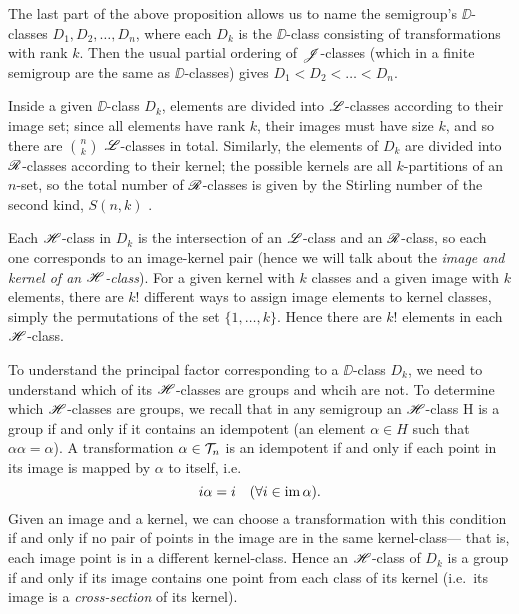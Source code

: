 The last part of the above proposition allows us to name the semigroup's
$\DD$-classes $D_1, D_2, \dots, D_n$, where each $D_k$ is the $\DD$-class
consisting of transformations with rank $k$.  Then the usual partial ordering of
$\mathrel{\mathscr{J}}$-classes (which in a finite semigroup are the same as $\DD$-classes) gives
$D_1 < D_2 < \dots < D_n$.

Inside a given $\DD$-class $D_k$, elements are divided into $\mathrel{\mathscr{L}}$-classes
according to their image set; since all elements have rank $k$, their images
must have size $k$, and so there are $\binom{n}{k}$ $\mathrel{\mathscr{L}}$-classes in total.
Similarly, the elements of $D_k$ are divided into $\mathrel{\mathscr{R}}$-classes according to
their kernel; the possible kernels are all $k$-partitions of an $n$-set, so the
total number of $\mathrel{\mathscr{R}}$-classes is given by the Stirling number of the second
kind, $S(n,k)$ .

Each $\mathrel{\mathscr{H}}$-class in $D_k$ is the intersection of an $\mathrel{\mathscr{L}}$-class and an
$\mathrel{\mathscr{R}}$-class, so each one corresponds to an image-kernel pair (hence we will talk
about the \textit{image and kernel of an $\mathrel{\mathscr{H}}$-class}).  For a given kernel with
$k$ classes and a given image with $k$ elements, there are $k!$ different ways
to assign image elements to kernel classes, simply the permutations of the set
$\{1, \dots, k\}$.  Hence there are $k!$ elements in each $\mathrel{\mathscr{H}}$-class.

To understand the principal factor corresponding to a $\DD$-class $D_k$, we need
to understand which of its $\mathrel{\mathscr{H}}$-classes are groups and whcih are not.  To
determine which $\mathrel{\mathscr{H}}$-classes are groups, we recall that in any semigroup an
$\mathrel{\mathscr{H}}$-class H is a group if and only if it contains an idempotent (an element
$\alpha \in H$ such that $\alpha \alpha = \alpha$).  A transformation
$\alpha \in \mathcal{T}_n$ is an idempotent if and only if each point in its image is
mapped by $\alpha$ to itself, i.e.
$$i \alpha = i \quad (\forall i \in \operatorname{im} \alpha).$$
Given an image and a kernel, we can choose a transformation with this condition
if and only if no pair of points in the image are in the same kernel-class---
that is, each image point is in a different kernel-class.  Hence an $\mathrel{\mathscr{H}}$-class
of $D_k$ is a group if and only if its image contains one point from each class
of its kernel (i.e.~its image is a \textit{cross-section} of its kernel).

